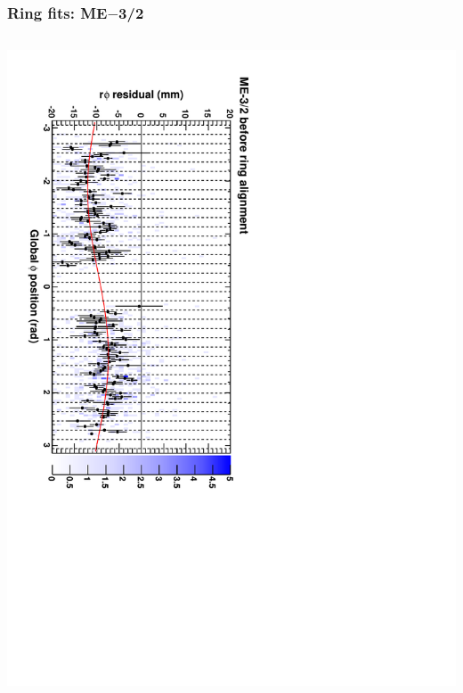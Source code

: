 \documentclass[compress]{beamer}
\begin{document}
\begin{frame}
\frametitle{Ring fits: ME$-$3/2}
\vfill
\begin{columns}
\includegraphics[height=\linewidth, angle=90]{ringfits_before/mem32.pdf}


\end{columns}
\end{frame}
\end{document}
